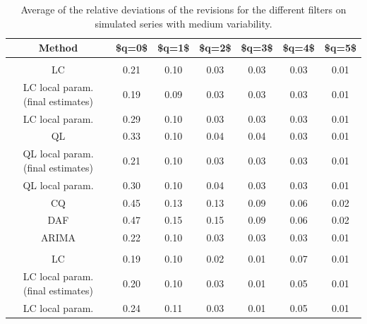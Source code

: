 \documentclass[
]{article}
\newcommand\1{\mathds{1}}
\begin{document}
\begin{longtable}[t]{ccccccc}

\caption{\label{tbl-simulrev}Average of the relative deviations of the
revisions for the different filters on simulated series with medium
variability.}

\tabularnewline

\toprule
Method & \$q=0\$ & \$q=1\$ & \$q=2\$ & \$q=3\$ & \$q=4\$ & \$q=5\$\\
\midrule
\addlinespace[0.3em]
\multicolumn{7}{l}{\textbf{$MAE_{fe}(q) = \mathbb E\left[\left|(TC_{t|t+q} -  TC_{t|last})/TC_{t|last}\right|\right]$}}\\
\hspace{1em}LC & 0.21 & 0.10 & 0.03 & 0.03 & 0.03 & 0.01\\
\hspace{1em}LC local param. (final estimates) & 0.19 & 0.09 & 0.03 & 0.03 & 0.03 & 0.01\\
\hspace{1em}LC local param. & 0.29 & 0.10 & 0.03 & 0.03 & 0.03 & 0.01\\
\hspace{1em}QL & 0.33 & 0.10 & 0.04 & 0.04 & 0.03 & 0.01\\
\hspace{1em}QL local param. (final estimates) & 0.21 & 0.10 & 0.03 & 0.03 & 0.03 & 0.01\\
\hspace{1em}QL local param. & 0.30 & 0.10 & 0.04 & 0.03 & 0.03 & 0.01\\
\hspace{1em}CQ & 0.45 & 0.13 & 0.13 & 0.09 & 0.06 & 0.02\\
\hspace{1em}DAF & 0.47 & 0.15 & 0.15 & 0.09 & 0.06 & 0.02\\
\hspace{1em}ARIMA & 0.22 & 0.10 & 0.03 & 0.03 & 0.03 & 0.01\\
\addlinespace[0.3em]
\multicolumn{7}{l}{\textbf{$MAE_{ce}(q)=\mathbb E\left[
\left|(TC_{t|t+q} - TC_{t|t+q+1})/TC_{t|t+q+1}\right|
\right]$}}\\
\hspace{1em}LC & 0.19 & 0.10 & 0.02 & 0.01 & 0.07 & 0.01\\
\hspace{1em}LC local param. (final estimates) & 0.20 & 0.10 & 0.03 & 0.01 & 0.05 & 0.01\\
\hspace{1em}LC local param. & 0.24 & 0.11 & 0.03 & 0.01 & 0.05 & 0.01\\

\end{longtable}
\end{document}
